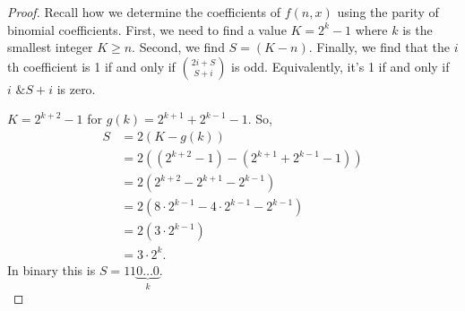 \documentclass{article}
\begin{document}
	\begin{proof}
		Recall how we determine the coefficients of $f(n,x)$ using the parity of binomial coefficients.
		First, we need to find a value $K = 2^{k} - 1$ where $k$ is the smallest integer $K \geq n$.
		Second, we find $S = (K - n)$.
		Finally, we find that the $i$th coefficient is 1 if and only if $\binom{2i+S}{S+i}$ is odd. Equivalently, it's 1 if and only if $i \texttt{ \& } S+i$ is zero.
		
		$K = 2^{k+2} - 1$ for $g(k) = 2^{k+1} + 2^{k-1} - 1$.
		So,
		\begin{align*}
			S &= 2(K - g(k)) \\
			&= 2\left((2^{k+2}-1) - (2^{k+1} + 2^{k-1} - 1)\right) \\
			&= 2\left(2^{k+2} - 2^{k+1} - 2^{k-1}\right) \\
			&= 2\left(8\cdot2^{k-1} - 4\cdot2^{k-1} - 2^{k-1}\right) \\
			&= 2\left(3\cdot2^{k-1}\right) \\
			&= 3\cdot2^k.
		\end{align*}
		In binary this is $S = 11\underbrace{0 \dots 0}_{k}$. \\
		

\end{proof}
\end{document}
